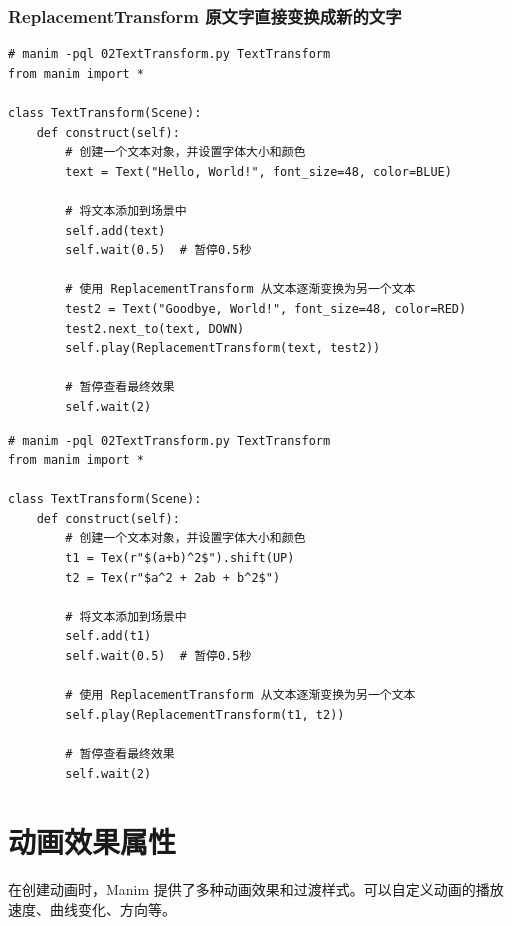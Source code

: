 \subsubsection{ReplacementTransform 原文字直接变换成新的文字}
\label{subsubsec:manim_animation_transform_text_replacementtransform}
\begin{lstlisting}[style=pythonstyle]
# manim -pql 02TextTransform.py TextTransform
from manim import *

class TextTransform(Scene):
    def construct(self):
        # 创建一个文本对象，并设置字体大小和颜色
        text = Text("Hello, World!", font_size=48, color=BLUE)

        # 将文本添加到场景中
        self.add(text)
        self.wait(0.5)  # 暂停0.5秒
        
        # 使用 ReplacementTransform 从文本逐渐变换为另一个文本
        test2 = Text("Goodbye, World!", font_size=48, color=RED)
        test2.next_to(text, DOWN)
        self.play(ReplacementTransform(text, test2))

        # 暂停查看最终效果
        self.wait(2)
\end{lstlisting}

\begin{lstlisting}[style=pythonstyle]
# manim -pql 02TextTransform.py TextTransform
from manim import *

class TextTransform(Scene):
    def construct(self):
        # 创建一个文本对象，并设置字体大小和颜色
        t1 = Tex(r"$(a+b)^2$").shift(UP)
        t2 = Tex(r"$a^2 + 2ab + b^2$")

        # 将文本添加到场景中
        self.add(t1)
        self.wait(0.5)  # 暂停0.5秒

        # 使用 ReplacementTransform 从文本逐渐变换为另一个文本
        self.play(ReplacementTransform(t1, t2))

        # 暂停查看最终效果
        self.wait(2)
\end{lstlisting}

\section{动画效果属性}
\label{sec:manim_animation_animation_style}
在创建动画时，Manim 提供了多种动画效果和过渡样式。可以自定义动画的播放速度、曲线变化、方向等。

